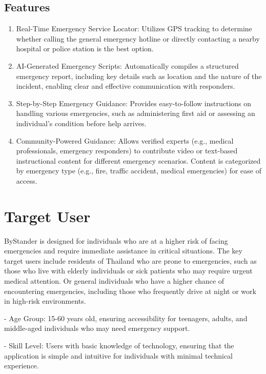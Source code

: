 \subsection{Features}
\label{subsection:features}

\begin{enumerate}[leftmargin=80pt]
    \item Real-Time Emergency Service Locator: Utilizes GPS tracking to determine whether calling the general emergency hotline or directly contacting a nearby hospital or police station is the best option.
    \item AI-Generated Emergency Scripts: Automatically compiles a structured emergency report, including key details such as location and the nature of the incident, enabling clear and effective communication with responders.
    \item Step-by-Step Emergency Guidance: Provides easy-to-follow instructions on handling various emergencies, such as administering first aid or assessing an individual’s condition before help arrives.
    \item Community-Powered Guidance: Allows verified experts (e.g., medical professionals, emergency responders) to contribute video or text-based instructional content for different emergency scenarios.
    Content is categorized by emergency type (e.g., fire, traffic accident, medical emergencies) for ease of access.
\end{enumerate}

\section{Target User}
\label{section:target-user}

ByStander is designed for individuals who are at a higher risk of facing emergencies and require immediate assistance in critical situations. The key target users include residents of Thailand who are prone to emergencies, such as those who live with elderly individuals or sick patients who may require urgent medical attention. Or general individuals who have a higher chance of encountering emergencies, including those who frequently drive at night or work in high-risk environments.

- Age Group: 15-60 years old, ensuring accessibility for teenagers, adults, and middle-aged individuals who may need emergency support.

- Skill Level: Users with basic knowledge of technology, ensuring that the application is simple and intuitive for individuals with minimal technical experience.

